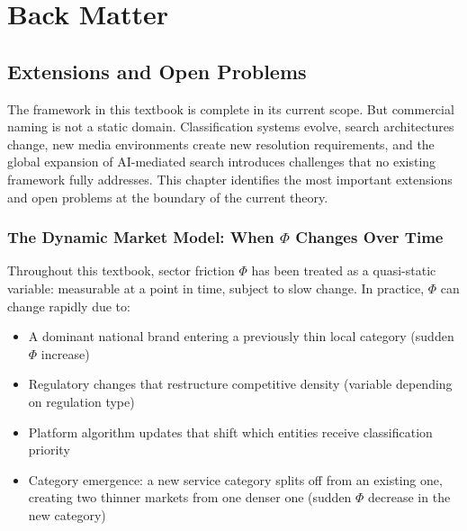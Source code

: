 \documentclass[12pt, openany]{book}
\theoremstyle{thmstyle}
\theoremstyle{defstyle}
\begin{document}
\tableofcontents
\newpage

\part*{Back Matter}

\chapter{Extensions and Open Problems}

\begin{keybox}
The framework in this textbook is complete in its current scope. But commercial naming is not a static domain. Classification systems evolve, search architectures change, new media environments create new resolution requirements, and the global expansion of AI-mediated search introduces challenges that no existing framework fully addresses. This chapter identifies the most important extensions and open problems at the boundary of the current theory.
\end{keybox}

\section{The Dynamic Market Model: When $\Phi$ Changes Over Time}

Throughout this textbook, sector friction $\Phi$ has been treated as a quasi-static variable: measurable at a point in time, subject to slow change. In practice, $\Phi$ can change rapidly due to:

\begin{itemize}[leftmargin=1.5em]
  \item A dominant national brand entering a previously thin local category (sudden $\Phi$ increase)
  \item Regulatory changes that restructure competitive density (variable depending on regulation type)
  \item Platform algorithm updates that shift which entities receive classification priority
  \item Category emergence: a new service category splits off from an existing one, creating two thinner markets from one denser one (sudden $\Phi$ decrease in the new category)
\end{itemize}
\end{document}
